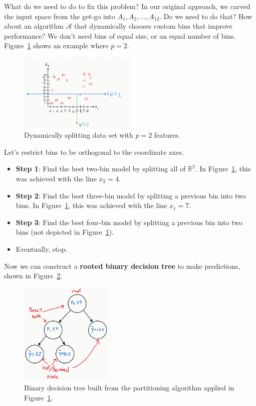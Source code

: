 \documentclass[12pt, a4paper]{article}
\theoremstyle{definition}
\begin{document}
	What do we need to do to fix this problem? In our original approach, we carved
	the input space from the get-go into $A_1,A_2,\ldots,A_{12}$. Do we need to do that?
	How about an algorithm $\mathcal{A}$ that dynamically chooses custom bins that
	improve performance? We don't need bins of equal size, or an equal number of bins.
	Figure~\ref{fig:dynamic-split-interval-data} shows an example where $p = 2$.
	\begin{figure}
		\centering
		\includegraphics[width=0.5\textwidth]{dynamic-split-interval-data}
		\caption{Dynamically splitting data set with $p = 2$ features.}
		\label{fig:dynamic-split-interval-data}
	\end{figure}
	Let's restrict bins to be orthogonal to the coordinate axes.
	\begin{itemize}
		\item \textbf{Step 1}: Find the best two-bin model by splitting
		all of $\mathbb{R}^2$. In Figure~\ref{fig:dynamic-split-interval-data},
		this was achieved with the line $x_2 = 4$.
		\item \textbf{Step 2}: Find the best three-bin model by
		splitting a previous bin into two bins. In
		Figure~\ref{fig:dynamic-split-interval-data}, this was achieved
		with the line $x_1 = 7$.
		\item \textbf{Step 3}: Find the best four-bin model by splitting a previous
		bin into two bins (not depicted in
		Figure~\ref{fig:dynamic-split-interval-data}).
		\item Eventually, stop.
	\end{itemize}
	Now we can construct a \textbf{rooted binary decision tree} to make predictions, shown in
	Figure~\ref{fig:regression-tree}.
	\begin{figure}
		\centering
		\includegraphics[width=0.4\textwidth]{regression-tree}
		\caption{Binary decision tree built from the partitioning algorithm
		applied in Figure~\ref{fig:dynamic-split-interval-data}.}
		\label{fig:regression-tree}
	\end{figure}
\end{document}
